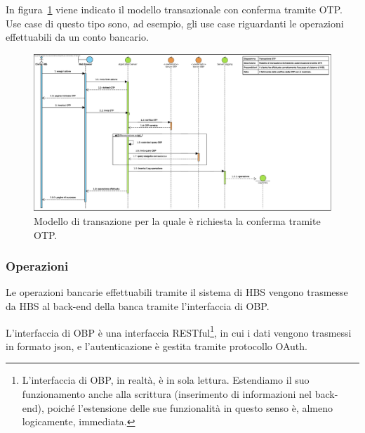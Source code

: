 In figura~\ref{fig:sequence:transazione-otp:modello} viene indicato il modello transazionale con conferma tramite OTP.
Use case di questo tipo sono, ad esempio, gli use case riguardanti le operazioni effettuabili da un conto bancario.

\begin{figure}[h]
	\centering
	\includegraphics[width=\textheight, angle=90]{Images/sequence/Transazione_OTP.eps}
	\caption{Modello di transazione per la quale è richiesta la conferma tramite OTP.}
	\label{fig:sequence:transazione-otp:modello}
\end{figure}

\subsubsection{Operazioni}

Le operazioni bancarie effettuabili tramite il sistema di HBS vengono trasmesse da HBS al back-end della banca tramite l'interfaccia di OBP.

L'interfaccia di OBP è una interfaccia RESTful\footnote{L'interfaccia di OBP, in realtà, è in sola lettura. Estendiamo il suo funzionamento anche alla scrittura (inserimento di informazioni nel back-end), poiché l'estensione delle sue funzionalità in questo senso è, almeno logicamente, immediata.}, in cui i dati vengono trasmessi in formato json, e l'autenticazione è gestita tramite protocollo OAuth.

